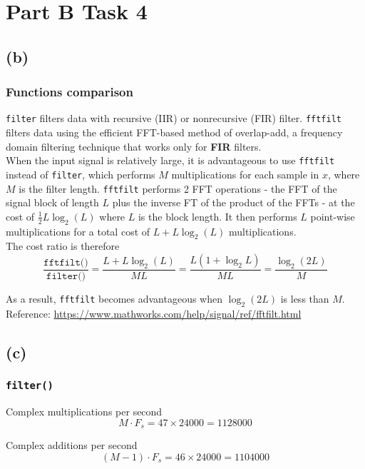 \documentclass{article}
\newenvironment{homeworkProblem}[1]{
	\section*{#1}
	}{
}
\newenvironment{homeworkSection}[1]{
	\subsection*{#1}
	}{
}
\begin{document}
\begin{homeworkProblem}{Part B Task 4}
\begin{homeworkSection}{(b)}


\subsubsection*{Functions comparison}
\texttt{filter} filters data with recursive (IIR) or nonrecursive (FIR) filter. \texttt{fftfilt} filters data using the efficient FFT-based method of overlap-add, a frequency domain filtering technique that works only for \textbf{FIR} filters.\\

When the input signal is relatively large, it is advantageous to use \texttt{fftfilt} instead of \texttt{filter}, which performs $M$ multiplications for each sample in $x$, where $M$ is the filter length. \texttt{fftfilt} performs 2 FFT operations - the FFT of the signal block of length $L$ plus the inverse FT of the product of the FFTs - at the cost of $\frac{1}{2} L \log_2(L)$ where $L$ is the block length. It then performs $L$ point-wise multiplications for a total cost of $L + L \log_2(L)$ multiplications.\\

The cost ratio is therefore
\begin{equation}
\frac{\texttt{fftfilt()}}{\texttt{filter()}} = \frac{L + L \log_2(L)}{ML} = \frac{L(1 + \log_2 L)}{ML} = \frac{\log_2(2L)}{M}
\end{equation}

As a result, \texttt{fftfilt} becomes advantageous when $\log_2(2L)$ is less than $M$.\\

Reference: \url{https://www.mathworks.com/help/signal/ref/fftfilt.html}

\end{homeworkSection}


\begin{homeworkSection}{(c)}

\subsubsection*{\texttt{filter()}}
Complex multiplications per second
\begin{equation}
M \cdot F_s = 47 \times 24000 = 1128000
\end{equation}

Complex additions per second
\begin{equation}
(M-1) \cdot F_s = 46 \times 24000 = 1104000
\end{equation}


\end{homeworkSection}
\end{homeworkProblem}
\end{document}
